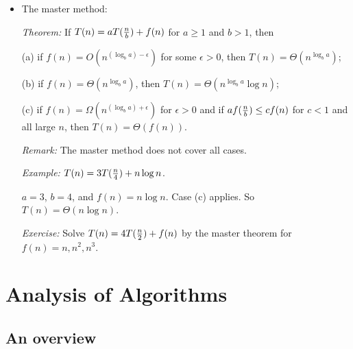 \documentclass{article}
\begin{document}
\begin{itemize}
\item The master method:

{\em Theorem:} If $T(n)=aT({n\over b})+f(n)$ for $a\ge1$ and $b>1$, then

(a) if $f(n)=O(n^{(\log_ba)-\epsilon})$ for some $\epsilon>0$, then
$T(n)=\Theta(n^{\log_ba})$;

(b) if $f(n)=\Theta(n^{\log_ba})$, then
$T(n)=\Theta(n^{\log_ba}\log n)$;

(c) if $f(n)=\Omega(n^{(\log_ba)+\epsilon})$ for $\epsilon>0$ and if
$af({n\over b})\le cf(n)$ for $c<1$ and all large $n$, then
$T(n)=\Theta(f(n))$.

{\em Remark:} The master method does not cover all cases.

{\em Example:} $T(n)=3T({n\over4})+n\log n$.

$a=3$, $b=4$, and $f(n)=n\log n$.
Case (c) applies. So $T(n)=\Theta(n\log n)$.

{\em Exercise:} Solve $T(n)=4T({n\over2})+f(n)$ by the master 
theorem for $f(n)=n, n^2, n^3$.

\end{itemize}

\newpage

\section{Analysis of Algorithms}

\subsection{An overview}

\end{document}
